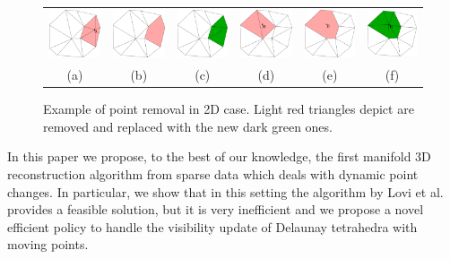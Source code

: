 \begin{figure}[t]
\centering
\begin{tabular}{cccccc}
\includegraphics[width=0.13\columnwidth]{./img//delaunayExampleMoving01}&
\includegraphics[width=0.13\columnwidth]{./img//delaunayExampleMoving02}&
\includegraphics[width=0.13\columnwidth]{./img//delaunayExampleMoving03}&
\includegraphics[width=0.13\columnwidth]{./img//delaunayExampleMoving04}&
\includegraphics[width=0.13\columnwidth]{./img//delaunayExampleMoving05}&
\includegraphics[width=0.13\columnwidth]{./img//delaunayExampleMoving06}\\
(a)&(b)&(c)&(d)&(e)&(f)
\end{tabular}
\caption{Example of point removal in 2D case. Light red triangles depict are removed and replaced with the new dark green ones.}
\label{fig:moving_ch5}
\end{figure}

In this paper we propose, to the best of our knowledge, the first manifold 3D reconstruction algorithm from sparse data which deals with dynamic point changes. In particular, we  show that in this setting the algorithm by Lovi et al. \cite{Lovi_et_al_11} provides a feasible solution, but it is very inefficient and we propose a novel efficient policy to handle the visibility update of Delaunay tetrahedra with moving points. 

